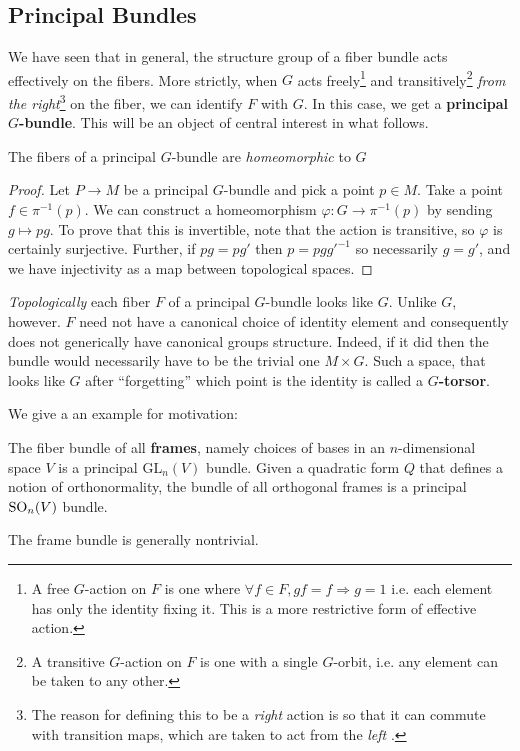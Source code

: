 		\subsection{Principal Bundles} %
		\label{sub:principal_bundles}
		

		
		We have seen that in general, the structure group of a fiber bundle acts effectively on the fibers. More strictly, when $G$ acts freely\footnote{A free $G$-action on $F$ is one where $\forall f \in F, gf = f \Rightarrow g = 1$ i.e. each element has only the identity fixing it. This is a more restrictive form of effective action.} and transitively\footnote{A transitive $G$-action on $F$ is one with a single $G$-orbit, i.e. any element can be taken to any other.} \emph{from the right}\footnote{The reason for defining this to be a \emph{right} action is so that it can commute with transition maps, which are taken to act from the \emph{left} \cite{stackoverflow1}.} on the fiber, we can identify $F$ with $G$. In this case, we get a \textbf{principal $G$-bundle}. This will be an object of central interest in what follows.
		
		\begin{obs}
			The fibers of a principal $G$-bundle are \emph{homeomorphic} to $G$
		\end{obs}
		\begin{proof}
			Let $P \to M$ be a principal $G$-bundle and pick a point $p \in M$. Take a point $f \in \pi^{-1}(p)$. We can construct a homeomorphism $\varphi: G \to \pi^{-1}(p)$ by sending $g \mapsto p g$. To prove that this is invertible, note that the action is transitive, so $\varphi$ is certainly surjective. Further, if $p g = p g'$ then $p = p g {g'}^{-1}$ so necessarily $g = g'$, and we have injectivity as a map between topological spaces.
		\end{proof}
		
		
		\emph{Topologically} each fiber $F$ of a principal $G$-bundle looks like $G$. Unlike $G$, however. $F$ need not have a canonical choice of identity element and consequently does not generically have canonical groups structure. Indeed, if it did then the bundle would necessarily have to be the trivial one $M \times G$. Such a space, that looks like $G$ after ``forgetting'' which point is the identity is called a \textbf{$G$-torsor}. 
		
		We give a an example for motivation:
		\begin{eg}
			The fiber bundle of all \textbf{frames}, namely choices of bases in an $n$-dimensional space $V$ is a principal $\mathrm{GL}_n(V)$ bundle. Given a quadratic form $Q$ that defines a notion of orthonormality, the bundle of all orthogonal frames is a principal $\mathrm{SO}_n(V)$ bundle.
		\end{eg}
		The frame bundle is generally nontrivial. 
		
